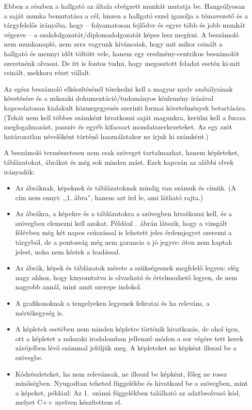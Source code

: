 \documentclass[a4paper,oneside]{article}
\begin{document}
Ebben a részben a hallgató az általa elvégzett munkát mutatja
be. Hangsúlyosan a saját munka bemutatása a cél, hiszen a hallgató
ezzel igazolja a témavezető és a tárgyfelelős irányába, hogy --
folyamatosan fejlődve és egyre több és jobb munkát végezve -- a
szakdolgozatát/diplomadolgozatát képes lesz megírni.  A beszámoló nem
munkanapló, nem arra vagyunk kíváncsiak, hogy mit mikor csinált a
hallgató és mennyi időt töltött vele, hanem egy eredmény-centrikus
beszámolót szeretnénk olvasni.  De itt is fontos tudni, hogy
megosztott feladat esetén ki-mit csinált, mekkora részt vállalt.

Az egész beszámoló elkészítésénél törekedni kell a magyar nyelv
szabályainak követésére és a műszaki dokumentáció/tudományos közlemény
írásával kapcsolatosan kialakult közmegegyezés szerinti formai
követelmények betartására.  (Tehát nem kell többes számként hivatkozni
saját magunkra, kerülni kell a furcsa megfogalmazást, passzív és egyéb
kifacsart mondatszerkezeteket.  Az egy szót határozatlan névelőként
történő használatakor ne írjuk ki számként.)


A beszámoló természetesen nem csak szöveget tartalmazhat, hanem
képleteket, táblázatokat, ábrákat és még sok minden mást.  Ezek
kapcsán az alábbi elvek irányadók:
\begin{itemize}
  \item Az ábráknak, képeknek és táblázatoknak mindig van számuk és
        címük. (A cím nem ennyi: ,,1. ábra'', hanem azt írd le, ami látható
        rajta.)

  \item Az ábrákra, a képekre és a táblázatokra a szövegben hivatkozni
        kell, és a szövegben elemezni kell azokat. Például
        .~ábrán látszik, hogy a vizsgált félévben még két
        napos csúszással is lehetett jeles érdemjegyet szerezni a tárgyból,
        de a pontosság még nem garancia a jó jegyre: öten nem kaptak jelest,
        noha nem késtek a leadással.

  \item Az ábrák, képek és táblázatok mérete a szükségesnek megfelelő
        legyen: elég nagy ahhoz, hogy kinyomtatva is olvasható és
        értelmezhető legyen, de nem nagyobb annál, mint amit szerepe
        indokol.

  \item A grafikonoknak a tengelyeken legyenek feliratai és ha releváns,
        a mértékegység is.

  \item A képletek esetében nem minden képletre történik hivatkozás, de
        ahol igen, ott a képletet a műszaki irodalomban jellemző módon a sor
        végére tett kerek zárójelben lévő számmal jelöljük meg.  A
        képleteket ne képként illeszd be a szövegbe.

  \item Kódrészleteket, ha nem relevánsak, ne illeszd be képként, főleg
        ne rossz minőségben. Nyugodtan teheted függelékbe és hivatkozd be a
        szövegben, mint a képeket, például: Az 1.~számú függelékben
        található az adatbeolvasó kód, melyet C++ nyelven készítettem el.
\end{itemize}
\end{document}
